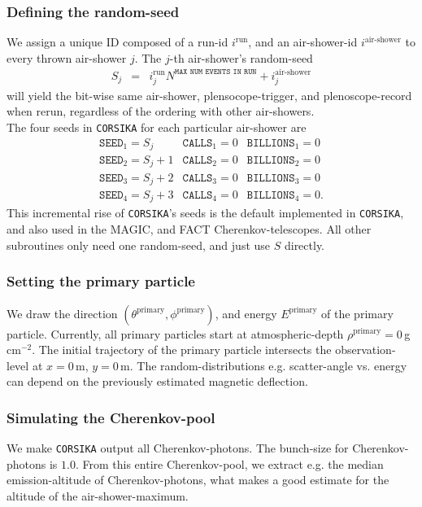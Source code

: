 \documentclass[a4paper,12pt,oneside]{article}
\begin{document}
\subsubsection{Defining the random-seed}
\label{SubSecRandomSeed}
%
We assign a unique ID composed of a run-id $i^\text{run}$, and an air-shower-id $i^\text{air-shower}$ to every thrown air-shower $j$.
%
The $j$-th air-shower's random-seed
%
\begin{eqnarray}
S_j &=& i^\text{run}_j N^\texttt{MAX NUM EVENTS IN RUN} + i^\text{air-shower}_j
\end{eqnarray}
%
will yield the bit-wise same air-shower, plensocope-trigger, and plenoscope-record when rerun, regardless of the ordering with other air-showers.\\
%
The four seeds in \texttt{CORSIKA} for each particular air-shower are
%
\begin{eqnarray}
\texttt{SEED}_1 = S_j & \texttt{CALLS}_1 = 0 & \texttt{BILLIONS}_1 = 0\\
\texttt{SEED}_2 = S_j+1 & \texttt{CALLS}_2 = 0 & \texttt{BILLIONS}_2 = 0\\
\texttt{SEED}_3 = S_j+2 & \texttt{CALLS}_3 = 0 & \texttt{BILLIONS}_3 = 0\\
\texttt{SEED}_4 = S_j+3 & \texttt{CALLS}_4 = 0 & \texttt{BILLIONS}_4 = 0.
\end{eqnarray}
%
This incremental rise of \texttt{CORSIKA}'s seeds is the default implemented in \texttt{CORSIKA}, and also used in the MAGIC, and FACT Cherenkov-telescopes.
%
All other subroutines only need one random-seed, and just use $S$ directly.
%
\subsubsection{Setting the primary particle}
\label{SubSecSettingPrimary}
%
We draw the direction \mbox{$(\theta^\text{primary}, \phi^\text{primary})$}, and energy $E^\text{primary}$ of the primary particle.
%
Currently, all primary particles start at atmospheric-depth \mbox{$\rho^\text{primary} = 0\,$g\,cm$^{-2}$}.
%
The initial trajectory of the primary particle intersects the observation-level at $x = 0\,$m, $y = 0\,$m.
%
The random-distributions e.g. scatter-angle vs. energy can depend on the previously estimated magnetic deflection.
%
\subsubsection{Simulating the Cherenkov-pool}
\label{SubSecSimulatingTheCherenkovPool}
%
We make \texttt{CORSIKA} output all Cherenkov-photons. The bunch-size for Cherenkov-photons is $1.0$.
%
From this entire Cherenkov-pool, we extract e.g. the median emission-altitude of Cherenkov-photons, what makes a good estimate for the altitude of the air-shower-maximum.
%
\end{document}
